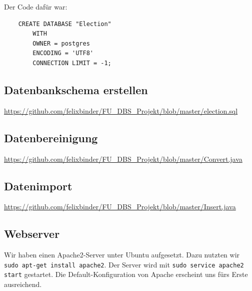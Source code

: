 \documentclass[BCOR0mm,fontsize=12pt,paper=a4,final,numbers=noenddot]{scrartcl}
\begin{document}
Der Code dafür war:
\begin{verbatim}
	CREATE DATABASE "Election"
	    WITH 
	    OWNER = postgres
	    ENCODING = 'UTF8'
	    CONNECTION LIMIT = -1;
\end{verbatim}

\subsection{Datenbankschema erstellen}
\url{https://github.com/felixbinder/FU_DBS_Projekt/blob/master/election.sql}

\subsection{Datenbereinigung}
\url{https://github.com/felixbinder/FU_DBS_Projekt/blob/master/Convert.java}

\subsection{Datenimport}
\url{https://github.com/felixbinder/FU_DBS_Projekt/blob/master/Insert.java}

\subsection{Webserver}
Wir haben einen Apache2-Server unter Ubuntu aufgesetzt. Dazu nutzten wir \verb|sudo apt-get install apache2|. Der Server wird mit \verb|sudo service apache2 start| gestartet. Die Default-Konfiguration von Apache erscheint uns fürs Erste ausreichend.
\end{document}
